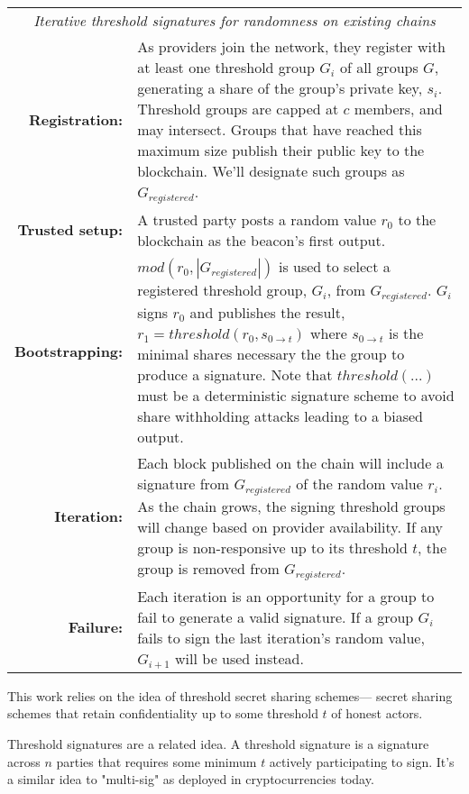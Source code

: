 \documentclass[11pt]{article}
\begin{document}
\begin{table*}[t]
  \centering
  \begin{tabular}{|rp{10cm}|}
  \hline
  \multicolumn{2}{|c|}{\textit{Iterative threshold signatures for
  randomness on existing chains}} \\
  \textbf{Registration:} & As providers join the network, they
  register with at least one threshold group $G_i$ of all groups $G$,
  generating a share of the group's private key, $s_i$. Threshold groups are
  capped at $c$ members, and may intersect. Groups that have reached
  this maximum size publish their public key to the blockchain. We'll
  designate such groups as $G_{registered}$. \\
  \textbf{Trusted setup:} & A trusted party posts a random value
  $r_0$ to the blockchain as the beacon's first output. \\
  \textbf{Bootstrapping:} & $mod(r_{0}, |G_{registered}|)$ is
  used to select a registered threshold group, $G_i$, from
  $G_{registered}$. $G_i$ signs $r_0$ and publishes the
  result, $r_1 = threshold(r_0, s_{0\rightarrow{t}})$ where
  $s_{0\rightarrow{t}}$ is the minimal shares necessary the the group
  to produce a signature. Note that $threshold(...)$ must be a
  deterministic signature scheme to avoid share withholding attacks
  leading to a biased output. \\
  \textbf{Iteration:} & Each block published on the chain will include
  a signature from $G_{registered}$ of the random value $r_i$. As the
  chain grows, the signing threshold groups will change based on
  provider availability. If any group is non-responsive up to its
  threshold $t$, the group is removed from $G_{registered}$. \\
  \textbf{Failure:} & Each iteration is an opportunity for a
  group to fail to generate a valid signature. If a group $G_i$ fails
  to sign the last iteration's random value, $G_{i+1}$ will be used
  instead. \\
  \hline
\end{tabular}
\end{table*}

This work relies on the idea of threshold secret sharing schemes---
secret sharing schemes that retain confidentiality up to some
threshold $t$ of honest actors.

Threshold signatures are a related idea. A threshold signature is a
signature across $n$ parties that requires some minimum $t$ actively
participating to sign. It's a similar idea to "multi-sig" as deployed
in cryptocurrencies today.
\end{document}
